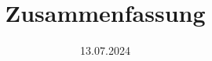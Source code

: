 \documentclass[a4paper,12pt]{article}
\title{Zusammenfassung}
\author{}
\date{13.07.2024}
\begin{document}
\raggedright

\maketitle

\newpage

\tableofcontents

\newpage
















\end{document}
